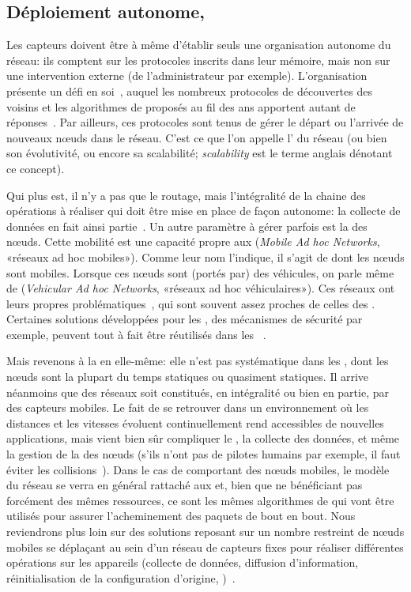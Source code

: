    \subsection{Déploiement autonome, }
Les capteurs doivent être à même d'établir seuls une organisation autonome du réseau: ils comptent sur les protocoles inscrits dans leur mémoire, mais non sur une intervention externe (de l'administrateur par exemple).
L'organisation présente un défi en soi~\cite{TV08}, auquel les nombreux protocoles de découvertes des voisins et les algorithmes de  proposés au fil des ans apportent autant de réponses~\cite{DQWH13}.
Par ailleurs, ces protocoles sont tenus de gérer le départ ou l'arrivée de nouveaux nœuds dans le réseau.
C'est ce que l'on appelle l' du réseau (ou bien son évolutivité, ou encore sa scalabilité; \textit{scalability} est le terme anglais dénotant ce concept).

Qui plus est, il n'y a pas que le routage, mais l'intégralité de la chaine des opérations à réaliser qui doit être mise en place de façon autonome: la collecte de données en fait ainsi partie~\cite{ZWPT10}.
Un autre paramètre à gérer parfois est la  des nœuds.
Cette mobilité est une capacité propre aux \manet (\textit{Mobile Ad hoc Networks}, «réseaux ad hoc mobiles»).
Comme leur nom l'indique, il s'agit de \wanet dont les nœuds sont mobiles.
Lorsque ces nœuds sont (portés par) des véhicules, on parle même de \vanet (\textit{Vehicular Ad hoc Networks}, «réseaux ad hoc véhiculaires»).
Ces réseaux ont leurs propres problématiques~\cite{DYK12}, qui sont souvent assez proches de celles des \rcsfs.
Certaines solutions développées pour les \manet, des mécanismes de sécurité par exemple, peuvent tout à fait être réutilisés dans les \rcs~\cite{BMS13}.

Mais revenons à la  en elle-même: elle n'est pas systématique dans les \rcsfs, dont les nœuds sont la plupart du temps statiques ou quasiment statiques.
Il arrive néanmoins que des réseaux soit constitués, en intégralité ou bien en partie, par des capteurs mobiles.
Le fait de se retrouver dans un environnement où les distances et les vitesses évoluent continuellement rend accessibles de nouvelles applications, mais vient bien sûr compliquer le , la collecte des données, et même la gestion de la  des nœuds (s'ils n'ont pas de pilotes humains par exemple, il faut éviter les collisions~\cite{E-ZCGGK12}).
Dans le cas de \rcs comportant des nœuds mobiles, le modèle du réseau se verra en général rattaché aux \manet et, bien que ne bénéficiant pas forcément des mêmes ressources, ce sont les mêmes algorithmes de  qui vont être utilisés pour assurer l'acheminement des paquets de bout en bout.
Nous reviendrons plus loin sur des solutions reposant sur un nombre restreint de nœuds mobiles se déplaçant au sein d'un réseau de capteurs fixes pour réaliser différentes opérations sur les appareils (collecte de données, diffusion d'information, réinitialisation de la configuration d'origine, \etc)~\cite{HR13}.


